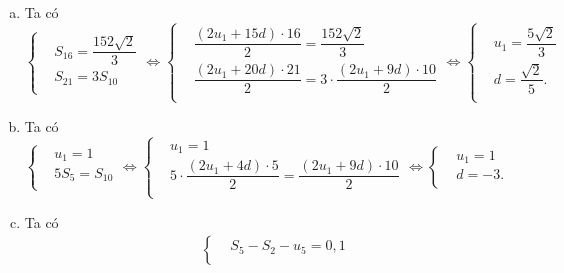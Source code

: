 \begin{bt}
{\begin{enumerate}[a)]
\begin{eqnarray*}
\begin{aligned}
					&2u_1+6d=14 \\
					&6(2u_1+11d)=129 \\
				\end{aligned}\right. \Leftrightarrow \left\{\begin{aligned} 
					&u_1=\dfrac{5}{2} \\
					&d=\dfrac{3}{2}. \\
				\end{aligned}\right.
			\end{eqnarray*}
			\item Ta có $\left\{\begin{aligned} 
				&S_{16}=\dfrac{152\sqrt{2}}{3} \\
				&S_{21}=3S_{10} \\
			\end{aligned}\right. \Leftrightarrow \left\{\begin{aligned} 
				&\dfrac{(2u_1+15d)\cdot 16}{2}=\dfrac{152\sqrt{2}}{3} \\
				&\dfrac{(2u_1+20d)\cdot 21}{2}=3\cdot \dfrac{(2u_1+9d)\cdot 10}{2} \\
			\end{aligned}\right. \Leftrightarrow \left\{\begin{aligned} 
				&u_1=\dfrac{5\sqrt{2}}{3} \\
				&d=\dfrac{\sqrt{2}}{5}. \\
			\end{aligned}\right. $ 
			\item Ta có $\left\{\begin{aligned} 
				&u_1=1 \\
				&5S_5=S_{10} \\
			\end{aligned}\right. \Leftrightarrow \left\{\begin{aligned} 
				&u_1=1 \\
				&5\cdot \dfrac{(2u_1+4d)\cdot 5}{2}=\dfrac{(2u_1+9d)\cdot 10}{2} \\
			\end{aligned}\right. \Leftrightarrow \left\{\begin{aligned} 
				&u_1=1 \\
				&d=-3. \\
			\end{aligned}\right. $
			\item Ta có
			\begin{eqnarray*}
				& & \left\{\begin{aligned} 
					&S_5-S_2-u_5=0{,}1 \\

\end{aligned}
\end{eqnarray*}
\end{enumerate}}
\end{bt}
